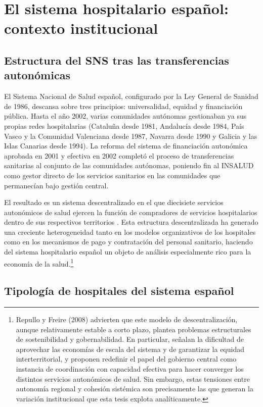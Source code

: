 \section{El sistema hospitalario español: contexto institucional}
\label{sec:contexto_sns}

\subsection{Estructura del SNS tras las transferencias autonómicas}

El Sistema Nacional de Salud español, configurado por la Ley General de Sanidad de 1986, descansa sobre tres principios: universalidad, equidad y financiación pública. Hasta el año 2002, varias comunidades autónomas gestionaban ya sus propias redes hospitalarias (Cataluña desde 1981, Andalucía desde 1984, País Vasco y la Comunidad Valenciana desde 1987, Navarra desde 1990 y Galicia y las Islas Canarias desde 1994). La reforma del sistema de financiación autonómica aprobada en 2001 y efectiva en 2002 completó el proceso de transferencias sanitarias al conjunto de las comunidades autónomas, poniendo fin al INSALUD como gestor directo de los servicios sanitarios en las comunidades que permanecían bajo gestión central.

El resultado es un sistema descentralizado en el que diecisiete servicios autonómicos de salud ejercen la función de compradores de servicios hospitalarios dentro de sus respectivos territorios \citep{repullo2008}. Esta estructura descentralizada ha generado una creciente heterogeneidad tanto en los modelos organizativos de los hospitales como en los mecanismos de pago y contratación del personal sanitario, haciendo del sistema hospitalario español un objeto de análisis especialmente rico para la economía de la salud.\footnote{Repullo y Freire (2008) advierten que este 
modelo de descentralización, aunque relativamente estable a corto plazo, 
plantea problemas estructurales de sostenibilidad y gobernabilidad. En 
particular, señalan la dificultad de aprovechar las economías de escala 
del sistema y de garantizar la equidad interterritorial, y proponen 
redefinir el papel del gobierno central como instancia de coordinación 
con capacidad efectiva para hacer converger los distintos servicios 
autonómicos de salud. Sin embargo, estas tensiones entre autonomía regional y cohesión 
sistémica son precisamente las que generan la variación institucional que 
esta tesis explota analíticamente.}


\subsection{Tipología de hospitales del sistema español}

